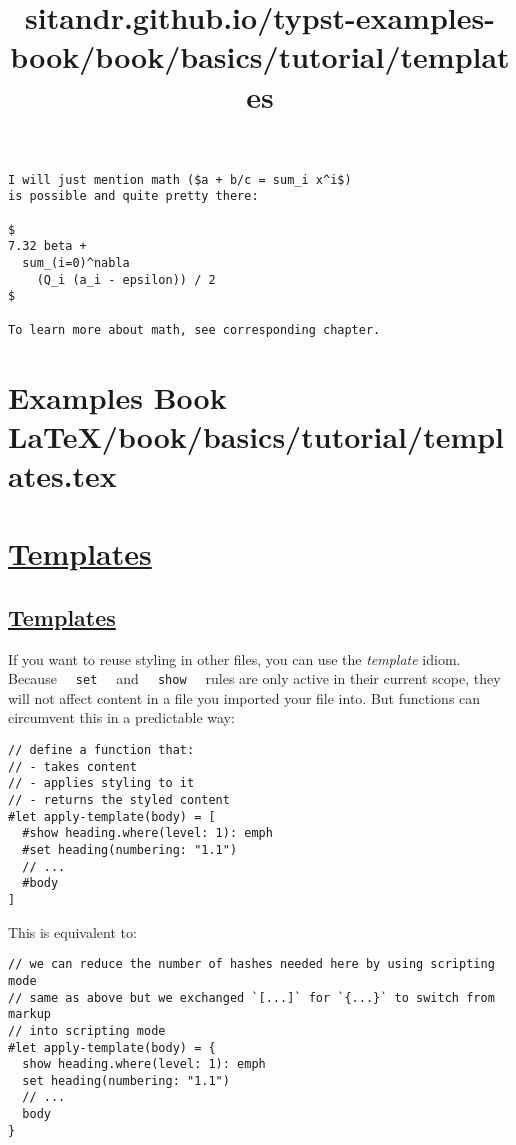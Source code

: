 \begin{verbatim}
I will just mention math ($a + b/c = sum_i x^i$)
is possible and quite pretty there:

$
7.32 beta +
  sum_(i=0)^nabla
    (Q_i (a_i - epsilon)) / 2
$

To learn more about math, see corresponding chapter.
\end{verbatim}

\pandocbounded{}


\section{Examples Book LaTeX/book/basics/tutorial/templates.tex}
\title{sitandr.github.io/typst-examples-book/book/basics/tutorial/templates}

\section{\texorpdfstring{\hyperref[templates]{Templates}}{Templates}}\label{templates}

\subsection{\texorpdfstring{\hyperref[templates-1]{Templates}}{Templates}}\label{templates-1}

If you want to reuse styling in other files, you can use the
\emph{template} idiom. Because \texttt{\ }{\texttt{\ set\ }}\texttt{\ }
and \texttt{\ }{\texttt{\ show\ }}\texttt{\ } rules are only active in
their current scope, they will not affect content in a file you imported
your file into. But functions can circumvent this in a predictable way:

\begin{verbatim}
// define a function that:
// - takes content
// - applies styling to it
// - returns the styled content
#let apply-template(body) = [
  #show heading.where(level: 1): emph
  #set heading(numbering: "1.1")
  // ...
  #body
]
\end{verbatim}

This is equivalent to:

\begin{verbatim}
// we can reduce the number of hashes needed here by using scripting mode
// same as above but we exchanged `[...]` for `{...}` to switch from markup
// into scripting mode
#let apply-template(body) = {
  show heading.where(level: 1): emph
  set heading(numbering: "1.1")
  // ...
  body
}
\end{verbatim}

